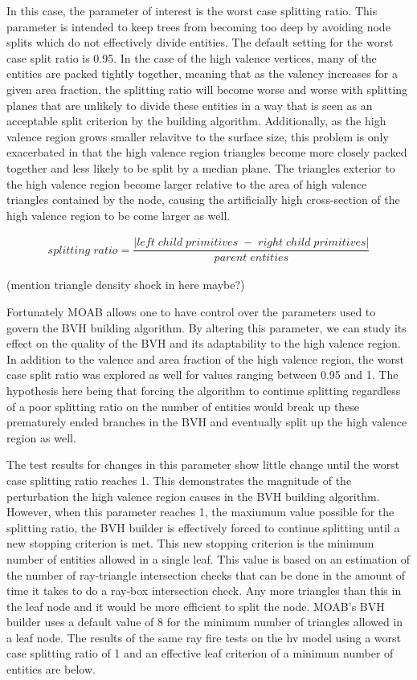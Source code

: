 \documentclass[12pt, a4paper]{article}
\begin{document}
In this case, the parameter of interest is the worst case splitting ratio. This parameter is intended to keep trees from becoming too deep by avoiding node splits which do not effectively divide entities. The default setting for the worst case split ratio is 0.95. In the case of the high valence vertices, many of the entities are packed tightly together, meaning that as the valency increases for a given area fraction, the splitting ratio will become worse and worse with splitting planes that are unlikely to divide these entities in a way that is seen as an acceptable split criterion by the building algorithm. Additionally, as the high valence region grows smaller relavitve to the surface size, this problem is only exacerbated in that the high valence region triangles become more closely packed together and less likely to be split by a median plane. The triangles exterior to the high valence region become larger relative to the area of high valence triangles contained by the node, causing the artificially high cross-section of the high valence region to be come larger as well.


  \begin{align*}
  splitting\;ratio  = \dfrac{|left\; child\; primitives\; -\; right\; child\; primitives|}{parent\; entities}
  \end{align*}

(mention triangle density shock in here maybe?)

  Fortunately MOAB allows one to have control over the parameters used to govern the BVH building algorithm. By altering this parameter, we can study its effect on the quality of the BVH and its adaptability to the high valence region. In addition to the valence and area fraction of the high valence region, the worst case split ratio was explored as well for values ranging between 0.95 and 1. The hypothesis here being that forcing the algorithm to continue splitting regardless of a poor splitting ratio on the number of entities would break up these prematurely ended branches in the BVH and eventually split up the high valence region as well.


  The test results for changes in this parameter show little change until the worst case splitting ratio reaches 1. This demonstrates the magnitude of the  perturbation the high valence region causes in the BVH building algorithm. However, when this parameter reaches 1, the maxiumum value possible for the splitting ratio, the BVH builder is effectively forced to continue splitting until a new stopping criterion is met. This new stopping criterion is the minimum number of entities allowed in a single leaf. This value is based on an estimation of the number of ray-triangle intersection checks that can be done in the amount of time it takes to do a ray-box intersection check. Any more triangles than this in the leaf node and it would be more efficient to split the node. MOAB's BVH builder uses a default value of 8 for the minimum number of triangles allowed in a leaf node. The results of the same ray fire tests on the hv model using a worst case splitting ratio of 1 and an effective leaf criterion of a minimum number of entities are below.
\end{document}
